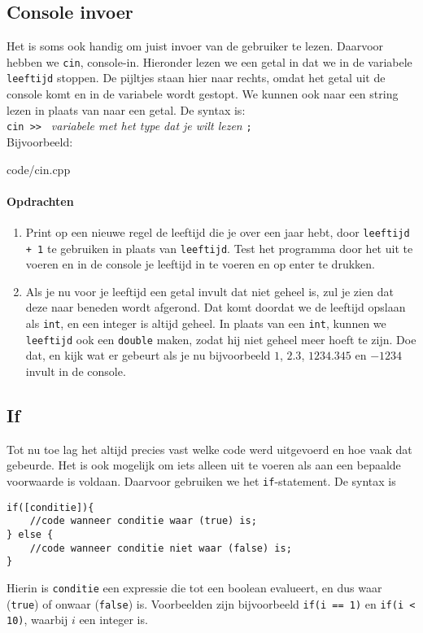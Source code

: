 \documentclass[12pt,a4paper]{article}
\newcommand{\code}{}
\newcommand{\icode}{\lstinline}
\begin{document}
\subsection{Console invoer}
Het is soms ook handig om juist invoer van de gebruiker te lezen. Daarvoor hebben we \icode{cin}, console-in. Hieronder lezen we een getal in dat we in de variabele \icode{leeftijd} stoppen. De pijltjes staan hier naar rechts, omdat het getal uit de console komt en in de variabele wordt gestopt. We kunnen ook naar een string lezen in plaats van naar een getal. De syntax is: \\

\icode{cin >> } \emph{variabele met het type dat je wilt lezen} \icode{;}\\

Bijvoorbeeld:

\code{code/cin.cpp}
\paragraph{Opdrachten}
\begin{enumerate}
	\item Print op een nieuwe regel de leeftijd die je over een jaar hebt, door \icode{leeftijd + 1} te gebruiken in plaats van \icode{leeftijd}.
		Test het programma door het uit te voeren en in de console je leeftijd in te voeren en op enter te drukken.
	\item
		Als je nu voor je leeftijd een getal invult dat niet geheel is, zul je zien dat deze naar beneden wordt afgerond. Dat komt doordat we de leeftijd opslaan als \icode{int}, en een integer is altijd geheel.
		In plaats van een \icode{int}, kunnen we \icode{leeftijd} ook een \icode{double} maken, zodat hij niet geheel meer hoeft te zijn. Doe dat, en kijk wat er gebeurt als je nu bijvoorbeeld $1$, $2.3$, $1234.345$ en $-1234$ invult in de console.
\end{enumerate}


\subsection{If}
Tot nu toe lag het altijd precies vast welke code werd uitgevoerd en hoe vaak dat gebeurde. Het is ook mogelijk om iets alleen uit te voeren als aan een bepaalde voorwaarde is voldaan. Daarvoor gebruiken we het \icode{if}-statement. De syntax is
\begin{lstlisting}
if([conditie]){
	//code wanneer conditie waar (true) is;
} else {
	//code wanneer conditie niet waar (false) is;
}
\end{lstlisting}
Hierin is \icode{conditie} een expressie die tot een boolean evalueert, en dus waar (\icode{true}) of onwaar (\icode{false}) is. Voorbeelden zijn bijvoorbeeld \icode{if(i == 1)} en \icode{if(i < 10)}, waarbij $i$ een integer is. 
\end{document}
